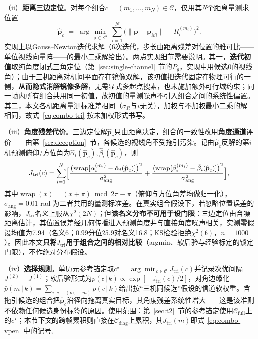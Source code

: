 \documentclass[UTF8,a4paper,zihao=-4]{ctexart}
\begin{document}
（ii）\textbf{距离三边定位}。对每个组合\(c=(m_1,\dots,m_N)\in\mathcal C\)，仅用其\(N\)个距离量测求位置
\begin{equation}
\hat{\boldsymbol p}_c\;=\;\arg\min_{\boldsymbol p\in\mathbb R^3}\ \sum_{i=1}^{N}\bigl(\lVert\boldsymbol p-\boldsymbol p_{M i}\rVert-R_i^{(m_i)}\bigr)^2 .
\label{eq:combo-tri}
\end{equation}
实现上以Gauss--Newton迭代求解（6次迭代，步长由距离残差对位置的雅可比——单位视线向量阵——的最小二乘解给出）。两点实现细节需要说明。其一，\textbf{迭代初值}取纯角度闭式三角定位（第~\ref{sec:single-channel}~节的\(P_g\)，实现中用候选0的视线角）；由于三机距离对机间平面存在镜像双解，该初值把迭代固定在物理可行的一侧，\textbf{从而隐式消解镜像多解}，无需显式多起点搜索，也未施加额外可行域约束；同一帧内所有组合共用同一初值，故初值的量测噪声不引入组合之间的系统性偏置。其二，本文各机距离量测标准差相同（\(\sigma_R\)与\(i\)无关），加权与不加权最小二乘的解相同，故式~\eqref{eq:combo-tri} 按未加权形式书写。

（iii）\textbf{角度残差代价}。三边定位解\(\hat{\boldsymbol p}_c\)只由距离决定，组合的一致性改用\textbf{角度通道}评价——由第~\ref{sec:deception}~节，各候选的视线角不受拖引污染。记由\(\hat{\boldsymbol p}_c\)反解的第\(i\)机预测俯仰/方位角为\(\hat\alpha_i(\hat{\boldsymbol p}_c),\hat\beta_i(\hat{\boldsymbol p}_c)\)，则
\begin{equation}
J_{\mathrm{tri}}(c)=\sum_{i=1}^{N}\Bigl[
\frac{\bigl(\operatorname{wrap}[\alpha_i^{(m_i)}-\hat\alpha_i(\hat{\boldsymbol p}_c)]\bigr)^2}{\sigma_{\mathrm{ang}}^2}
+\frac{\bigl(\operatorname{wrap}[\beta_i^{(m_i)}-\hat\beta_i(\hat{\boldsymbol p}_c)]\bigr)^2}{\sigma_{\mathrm{ang}}^2}\Bigr],
\label{eq:combo-jtri}
\end{equation}
其中\(\operatorname{wrap}(x)=(x+\pi)\bmod 2\pi-\pi\)（俯仰与方位角差均做归一化），\(\sigma_{\mathrm{ang}}=0.01\) rad 为二者共用的量测标准差。在真实组合假设下，若忽略位置误差的影响，\(J_{\mathrm{tri}}\)名义上服从\(\chi^2(2N)\)；但\textbf{该名义分布不可用于设门限}：三边定位由含噪距离估计，其位置误差经几何传播进入预测角度并与直接角度噪声相关，实测零假设均值为7.94（名义6；0.99分位25.9对名义16.8；KS检验拒绝\(\chi^2(6)\)，\(n=1000\)）。因此本文\textbf{只将\(J_{\mathrm{tri}}\)用于组合之间的相对比较}（argmin、软后验与经验标定的锁定门限），不作绝对分布假设。

（iv）\textbf{选择规则}。单历元参考锚定取\(c^\star=\arg\min_{c\in\mathcal C}J_{\mathrm{tri}}(c)\)并记录次优间隔\(J^{(2)}-J^{(1)}\)；软后验形式为\(p(c\,|\,k)\propto\exp[-J_{\mathrm{tri}}(c)/2]\)，对角边缘化\(\bar p(m\,|\,k)=\sum_{c:\,c\equiv(m,\dots,m)}p(c\,|\,k)\)给出按“三机同候选”假设的信道软权重。含拖引候选的组合把\(\hat{\boldsymbol p}_c\)沿径向拖离真实目标，其角度残差系统性增大——这是该准则不依赖任何候选身份标签的原因。使用范围：第~\ref{sec:t2}~节的参考锚定使用\(\mathcal C_{\mathrm{full}}\)上的\(c^\star\)；本节下文的跨帧累积则直接在\(\mathcal C_{\mathrm{diag}}\)上累积，其\(J_{\mathrm{tri}}(m)\)即式~\eqref{eq:combo-vpen} 中的记号。
\end{document}
